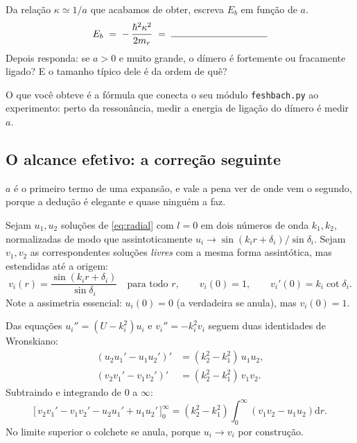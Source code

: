 \documentclass[11pt,a4paper]{article}
\newcommand{\dd}{\mathrm{d}}
\begin{document}
\begin{suavez}
Da relação $\kappa\simeq 1/a$ que acabamos de obter, escreva $E_{b}$ em função de $a$.
\[
E_{b} \;=\; -\,\frac{\hbar^{2}\kappa^{2}}{2m_{r}} \;=\; \rule{3.5cm}{0.4pt}
\]
Depois responda: se $a>0$ e muito grande, o dímero é fortemente ou fracamente ligado?
E o tamanho típico dele é da ordem de quê?

\vspace{1.8cm}
\hrulefill
\end{suavez}

O que você obteve é a fórmula que conecta o seu módulo \texttt{feshbach.py} ao
experimento: perto da ressonância, medir a energia de ligação do dímero é medir $a$.

\subsection{O alcance efetivo: a correção seguinte}

$a$ é o primeiro termo de uma expansão, e vale a pena ver de onde vem o segundo,
porque a dedução é elegante e quase ninguém a faz.

Sejam $u_{1},u_{2}$ soluções de \eqref{eq:radial} com $l=0$ em dois números de onda
$k_{1},k_{2}$, normalizadas de modo que assintoticamente
$u_{i}\to \sin(k_{i}r+\delta_{i})/\sin\delta_{i}$. Sejam $v_{1},v_{2}$ as
correspondentes soluções \emph{livres} com a mesma forma assintótica, mas estendidas
até a origem:
\begin{equation}
v_{i}(r) = \frac{\sin(k_{i}r+\delta_{i})}{\sin\delta_{i}}
\quad\text{para todo }r,
\qquad
v_{i}(0)=1,\qquad v_{i}'(0)=k_{i}\cot\delta_{i}.
\end{equation}
Note a assimetria essencial: $u_{i}(0)=0$ (a verdadeira se anula), mas $v_{i}(0)=1$.

Das equações $u_{i}''=(U-k_{i}^{2})u_{i}$ e $v_{i}''=-k_{i}^{2}v_{i}$ seguem duas
identidades de Wronskiano:
\begin{align}
\left(u_{2}u_{1}'-u_{1}u_{2}'\right)' &= (k_{2}^{2}-k_{1}^{2})\,u_{1}u_{2},\\
\left(v_{2}v_{1}'-v_{1}v_{2}'\right)' &= (k_{2}^{2}-k_{1}^{2})\,v_{1}v_{2}.
\end{align}
Subtraindo e integrando de $0$ a $\infty$:
\begin{equation}
\Big[\,v_{2}v_{1}'-v_{1}v_{2}'-u_{2}u_{1}'+u_{1}u_{2}'\,\Big]_{0}^{\infty}
=(k_{2}^{2}-k_{1}^{2})\int_{0}^{\infty}\!\left(v_{1}v_{2}-u_{1}u_{2}\right)\dd r.
\end{equation}
No limite superior o colchete se anula, porque $u_{i}\to v_{i}$ por construção.
\end{document}
